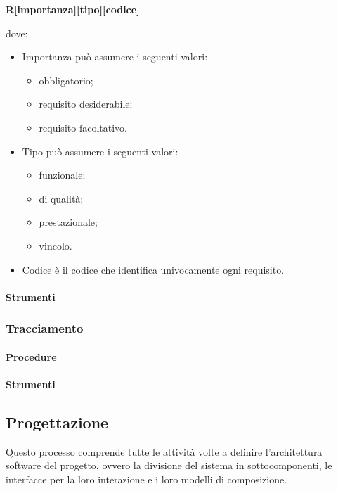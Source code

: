\begin{center}
\textbf{R[importanza][tipo][codice]}
\end{center}
dove:
\begin{itemize}
\item Importanza può assumere i seguenti valori:
\begin{itemize}
\item {}  obbligatorio;
\item {} requisito desiderabile;
\item {} requisito facoltativo.
\end{itemize}
\item Tipo può assumere i seguenti valori:
\begin{itemize}
\item {} funzionale;
\item {} di qualità;
\item {} prestazionale;
\item {} vincolo.
\end{itemize}
\item Codice è il codice che identifica univocamente ogni requisito.
\end{itemize}


\paragraph{Strumenti}

\subsubsection{Tracciamento}

\paragraph{Procedure}


\paragraph{Strumenti}




\subsection{Progettazione}
Questo processo comprende tutte le attività volte a definire l'architettura software del progetto, ovvero la divisione del sistema in sottocomponenti, le interfacce per la loro interazione e i loro modelli di composizione. %

